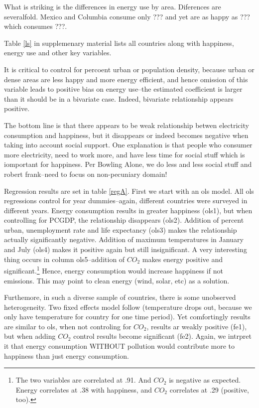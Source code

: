 \documentclass[10pt, letterpaper]{article}
\begin{document}
\begin{spacing}{1.4}
What is striking is the differences in energy use by area. Diferences are
severalfold. Mexico and Columbia
consume only ??? and yet are as happy as ??? which consumes ???.
 
Table \ref{ls} in supplemenary material lists all countries along with
happiness, energy use and other key variables.

It is critical to control for percoent urban or population density, because
urban or dense areas are less happy and more energy efficient, and hence
omission of this variable leads to positive bias on energy use--the estimated
coefficient   is larger than it should be in a bivariate case. Indeed, bivariate
relationship appears positive. 

The bottom line is that there appears to be weak relationship betwen electricity
consumption and happiness, but it disappears or indeed becomes negative when
taking into account social support. One explanation is that people who consumer
more electricity, need to work more, and have less time for social stuff which
is iomportant for happiness. Per Bowling Alone, we do less and less social stuff
and robert frank--need to focus on non-pecuniary domain!

Regression results are set in table \ref{regA}. First we start with an ols
model. All ols regressions control for year dummies--again, different countries
were surveyed in different years. Energy consumption results in greater
happiness (ols1), but when controlling for PCGDP, the relationship disappears
(ols2). Addition of percent urban, unemployment rate and life expectancy (ols3)
makes the relationship actually significantly negative.  Addition of maximum
temperatures in January and July (ols4) makes it positive again but still
insignificant.  A very interesting thing occurs in column ols5--addition of
$CO_2$ makes energy positive and significant.\footnote{The two variables are
  correlated at .91. And $CO_2$ is negative as expected. Energy correlates at .38
  with happiness, and $CO_2$ correlates at .29 (positive, too).}
 Hence, energy consumption would increase happiness if not emissions. This may
 point to clean energy (wind, solar, etc) as a solution. 

Furthemore, in such a diverse sample of countries, there is some unobserved
heterogeneity. Two fixed effects model follow (temperature drops out, because we
 only have temperature for country for one time period). Yet comfortingly
 results are similar to ols, when not controling for $CO_2$, results ar weakly
 positive (fe1), but when adding $CO_2$ control results become significant
 (fe2). Again, we intrpret it  that energy consumption WITHOUT pollution would
 contribute more to happiness than just energy consumption.  


\end{spacing}
\end{document}
